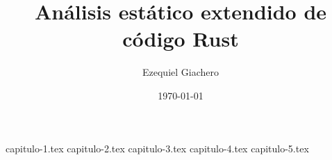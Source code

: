 \documentclass{report}
\title{Análisis estático extendido de código Rust}
\author{Ezequiel Giachero}
\date{\today}
\begin{document}
\maketitle
\tableofcontents

{capitulo-1.tex} %
{capitulo-2.tex} %
{capitulo-3.tex} %
{capitulo-4.tex} %
{capitulo-5.tex} %


\nocite{*}


\end{document}
